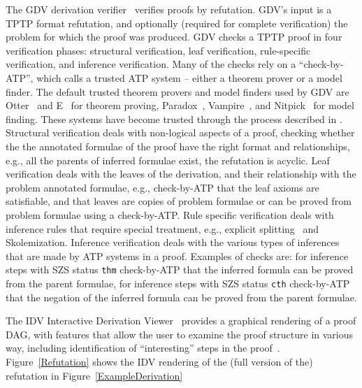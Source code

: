 \documentclass[runningheads]{llncs}
\newcommand{\smalltt}[1]{\small \texttt{#1}}
\begin{document}
The GDV derivation verifier~\cite{Sut06} verifies proofs by refutation.
GDV's input is a TPTP format refutation, and optionally (required for complete verification) the 
problem for which the proof was produced.
GDV checks a TPTP proof in four verification phases: structural verification, leaf verification,
rule-specific verification, and inference verification.
Many of the checks rely on a ``check-by-ATP'', which calls a trusted ATP system -- either a theorem 
prover or a model finder.
The default trusted theorem provers and model finders used by GDV are Otter~\cite{McC03-Otter}
and E~\cite{SCV19} for theorem proving, Paradox~\cite{CS18}, Vampire~\cite{KV13}, and
Nitpick~\cite{BN10-ITP} for model finding.
These systems have become trusted through the process described in \cite{SBB25}.
Structural verification deals with non-logical aspects of a proof, checking whether the
the annotated formulae of the proof have the right format and relationships, e.g., all the 
parents of inferred formulae exist, the refutation is acyclic. 
Leaf verification deals with the leaves of the derivation, and their relationship with
the problem annotated formulae, e.g., check-by-ATP that the leaf axioms are satisfiable, and 
that leaves are copies of problem formulae or can be proved from problem formulae using a 
check-by-ATP.
Rule specific verification deals with inference rules that require special treatment, e.g.,
explicit splitting~\cite{Wei01} and Skolemization. 
Inference verification deals with the various types of inferences that are made by ATP
systems in a proof.
Examples of checks are: for inference steps with SZS status {\smalltt{thm}} check-by-ATP that the 
inferred formula can be proved from the parent formulae, for inference steps with SZS status 
{\smalltt{cth}} check-by-ATP that the negation of the inferred formula can be proved from the 
parent formulae.


The IDV Interactive Derivation Viewer~\cite{TPS07} provides a graphical rendering of a proof
DAG, with features that allow the user to examine the proof structure in various way, 
including identification of ``interesting'' steps in the proof~\cite{PGS06}.
Figure~\ref{Refutation} shows the IDV rendering of the (full version of the) refutation in 
Figure~\ref{ExampleDerivation}
\end{document}
